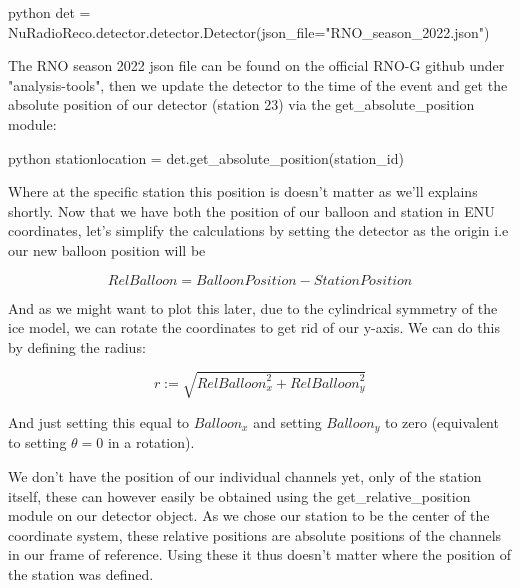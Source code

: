 \begin{mintedbox}{python}
det = NuRadioReco.detector.detector.Detector(json_file="RNO_season_2022.json")
\end{mintedbox}

The RNO season 2022 json file can be found on the official RNO-G github under
"analysis-tools", then we update the detector to the time of the event and get
the absolute position of our detector (station 23) via the
get\_absolute\_position module:

\begin{mintedbox}{python}
	stationlocation = det.get_absolute_position(station_id)
\end{mintedbox}

Where at the specific station this position is doesn't matter as we'll explains
shortly.  Now that we have both the position of our balloon and station in ENU
coordinates, let's simplify the calculations by setting the detector as the
origin i.e our new balloon position will be

\begin{equation}
	\textit{RelBalloon} = \textit{BalloonPosition} - \textit{StationPosition}
\end{equation}

And as we might want to plot this later, due to the cylindrical symmetry of the
ice model, we can rotate the coordinates to get rid of our y-axis. We can do
this by defining the radius:

\begin{equation}
	r := \sqrt{\textit{RelBalloon}_x^2 + \textit{RelBalloon}_y^2}
\end{equation}

And just setting this equal to $\textit{Balloon}_x$ and setting $\textit{Balloon}_y$ to
zero (equivalent to setting $\theta= 0$ in a rotation).

We don't have the position of our individual channels yet, only of the
station itself, these can however easily be obtained using the
get\_relative\_position module on our detector object. As we chose our station
to be the center of the coordinate system, these relative positions are
absolute positions of the channels in our frame of reference. Using
these it thus doesn't matter where the position of the station was defined.

